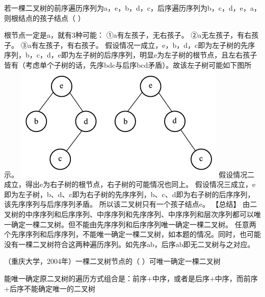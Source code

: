 \question 若一棵二叉树的前序遍历序列为a，e，b，d，c，后序遍历序列为b，c，d，e，a，则根结点的孩子结点（
）
\par{}
\begin{solution}根节点一定是a，就有3种可能： ①a有左孩子，无右孩子。
②a无左孩子，有右孩子。 ③a有左孩子，有右孩子。
假设情况一成立，e，b，d，c即为左子树的先序序列，b，c，d，e即为左子树的后序序列，明显e为左子树的根节点，且左右孩子皆有（考虑单个子树的话，先序bdc与后序bcd矛盾）。故该左子树可能如下图所示。
\includegraphics[width=4.00000in,height=2.18750in]{computerassets/8477d425f479b1f532486ea3861e03b0.jpeg}
假设情况二成立，得出e为右子树的根节点，右子树的可能情况也同上。
假设情况三成立，e即为左子树，b、d、c即为右子树的先序序列，b、c、d即为右子树的后序序列，该先序序列与后序序列矛盾。
所以该二叉树只有一个孩子结点e。 【总结】
由二叉树的中序序列和后序序列、中序序列和先序序列、中序序列和层次序列都可以唯一确定一棵二叉树。但不能由先序序列和后序序列唯一确定一棵二叉树。
任意两个先序序列和后序序列，不能唯一确定一棵二叉树，如本题的情况。同时，也可能没有一棵二叉树符合这两种遍历序列。如先序ab，后序ab即无二叉树与之对应。
\end{solution}
\question （重庆大学，2004年）一棵二叉树节点的（ ）可唯一确定一棵二叉树
\par{}
\begin{solution}能唯一确定原二叉树的遍历方式组合是：前序+中序，或者是后序+中序，而前序+后序不能确定唯一的二叉树
\end{solution}
